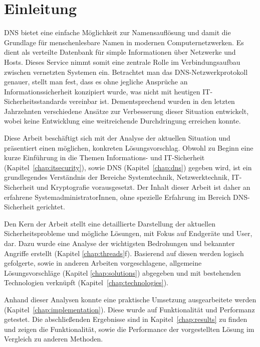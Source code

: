 \chapter{Einleitung}
\ac{DNS} bietet eine einfache Möglichkeit zur Namensauflösung und damit die Grundlage für menschenlesbare Namen in modernen Computernetzwerken. Es dient als verteilte Datenbank für simple Informationen über Netzwerke und Hosts. Dieses Service nimmt somit eine zentrale Rolle im Verbindungsaufbau zwischen vernetzten Systemen ein. Betrachtet man das DNS-Netzwerkprotokoll genauer, stellt man fest, dass es ohne jegliche Ansprüche an Informationssicherheit konzipiert wurde, was nicht mit heutigen IT-Sicherheitsstandards vereinbar ist. Dementsprechend wurden in den letzten Jahrzehnten verschiedene Ansätze zur Verbesserung dieser Situation entwickelt, wobei keine Entwicklung eine weitreichende Durchdringung erreichen konnte.

Diese Arbeit beschäftigt sich mit der Analyse der aktuellen Situation und präsentiert einen möglichen, konkreten Lösungsvorschlag. Obwohl zu Beginn eine kurze Einführung in die Themen Informations- und IT-Sicherheit (Kapitel~\ref{chap:itsecurity}), sowie DNS (Kapitel~\ref{chap:dns}) gegeben wird, ist ein grundlegendes Verständnis der Bereiche Systemtechnik, Netzwerktechnik, IT-Sicherheit und Kryptografie vorausgesetzt. Der Inhalt dieser Arbeit ist daher an erfahrene SystemadministratorInnen, ohne spezielle Erfahrung im Bereich DNS-Sicherheit gerichtet.

Den Kern der Arbeit stellt eine detaillierte Darstellung der aktuellen Sicherheitsprobleme und mögliche Lösungen, mit Fokus auf Endgeräte und User, dar. Dazu wurde eine Analyse der wichtigsten Bedrohungen und bekannter Angriffe erstellt (Kapitel \ref{chap:threads}f). Basierend auf diesen werden logisch gefolgerte, sowie in anderen Arbeiten vorgeschlagene, allgemeine Lösungsvorschläge (Kapitel \ref{chap:solutions}) abgegeben und mit bestehenden Technologien verknüpft (Kapitel~\ref{chap:technologies}).

Anhand dieser Analysen konnte eine praktische Umsetzung ausgearbeitete werden (Kapitel~\ref{chap:implementation}). Diese wurde auf Funktionalität und Performanz getestet. Die abschließenden Ergebnisse sind in Kapitel~\ref{chap:results} zu finden und zeigen die Funktionalität, sowie die Performance der vorgestellten Lösung im Vergleich zu anderen Methoden.    
